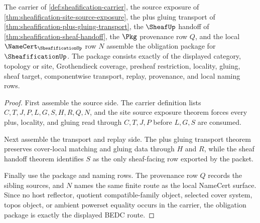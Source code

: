 \begin{theorem}
\label{thm:sheafification-obligation-closure-package}
The carrier of \autoref{def:sheafification-carrier}, the source exposure of \autoref{thm:sheafification-site-source-exposure}, the plus gluing transport of \autoref{thm:sheafification-plus-gluing-transport}, the $\SheafUp$ handoff of \autoref{thm:sheafification-sheaf-handoff}, the $\Pkg$ provenance row $Q$, and the local $\NameCert_{\SheafificationUp}$ row $N$ assemble the obligation package for $\SheafificationUp$. The package consists exactly of the displayed category, topology or site, Grothendieck coverage, presheaf restriction, locality, gluing, sheaf target, componentwise transport, replay, provenance, and local naming rows.
\end{theorem}
\begin{proof}
First assemble the source side. The carrier definition lists $C,T,J,P,L,G,S,H,R,Q,N$, and the site source exposure theorem forces every plus, locality, and gluing read through $C,T,J,P$ before $L,G,S$ are consumed.

Next assemble the transport and replay side. The plus gluing transport theorem preserves cover-local matching and gluing data through $H$ and $R$, while the sheaf handoff theorem identifies $S$ as the only sheaf-facing row exported by the packet.

Finally use the package and naming rows. The provenance row $Q$ records the sibling sources, and $N$ names the same finite route as the local NameCert surface. Since no host reflector, quotient compatible-family object, selected cover system, topos object, or ambient powerset equality occurs in the carrier, the obligation package is exactly the displayed BEDC route.
\end{proof}

